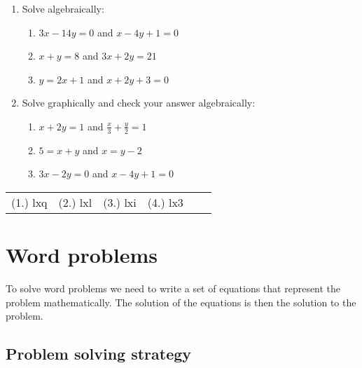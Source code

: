 \begin{exercises}{}
{
\begin{enumerate}[noitemsep, label=\textbf{\arabic*}. ] 
\item Solve algebraically: 
\begin{enumerate}[noitemsep, label=\textbf{(\alph*)} ] 
\item $3x-14y=0$ and $x-4y+1=0$
\item $x+y=8$ and $3x + 2y = 21$
\item $y=2x+1$ and $x + 2y + 3 = 0$
\end{enumerate}

\item Solve graphically and check your answer algebraically:

\begin{enumerate}[noitemsep, label=\textbf{(\alph*)} ] 

\item  $x+2y=1$ and $\frac{x}{3} + \frac{y}{2} = 1$
\item $5= x+y$ and $x = y-2$
\item $3x - 2y = 0$ and $x - 4y + 1 = 0$

\end{enumerate}
\end{enumerate}
\practiceinfo
\par 
\par \begin{tabular}[h]{cccccc}
(1.) lxq  &  (2.) lxl  &  (3.) lxi  &  (4.) lx3  & \end{tabular}
}
\end{exercises}

\section{Word problems}

To solve word problems we need to write a set of equations that represent the problem mathematically. 
The solution of the equations is then the solution to the problem.

\subsection*{Problem solving strategy}

